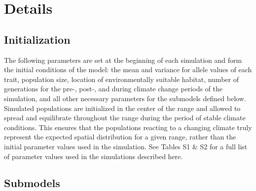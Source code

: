 \documentclass[12pt, oneside]{article}
\begin{document}
\section*{Details}
\subsection*{Initialization} 
The following parameters are set at the beginning of each simulation and form the initial conditions of the model: the mean and variance for allele values of each trait, population size, location of environmentally suitable habitat, number of generations for the pre-, post-, and during climate change periods of the simulation, and all other necessary parameters for the submodels defined below. Simulated populations are initialized in the center of the range and allowed to spread and equilibrate throughout the range during the period of stable climate conditions. This ensures that the populations reacting to a changing climate truly represent the expected spatial distribution for a given range, rather than the initial parameter values used in the simulation. See Tables S1 \& S2 for a full list of parameter values used in the simulations described here.

\subsection*{Submodels}
\end{document}

